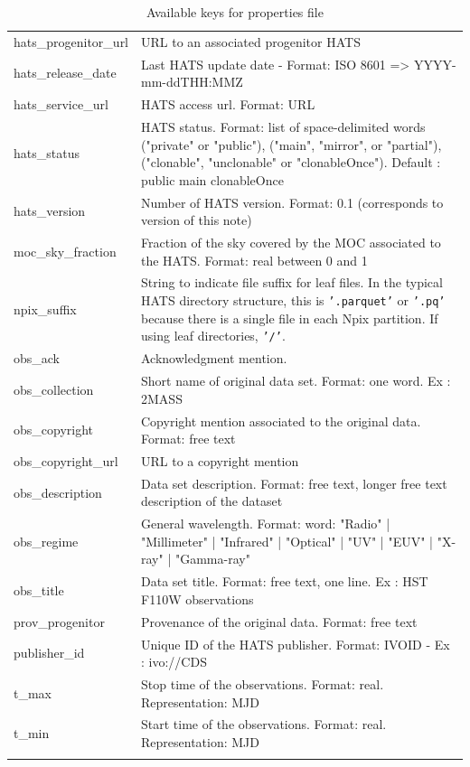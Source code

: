 \documentclass[11pt,a4paper]{ivoa}
\begin{document}
{\begin{longtable}[h!]{D{0.33\textwidth} D{0.67\textwidth}}
hats\_progenitor\_url &URL to an associated progenitor HATS \\
hats\_release\_date &Last HATS update date - Format: ISO 8601 => YYYY-mm-ddTHH:MMZ \\
hats\_service\_url &HATS access url. Format: URL \\
hats\_status &HATS status. Format: list of space-delimited words ("private" or "public"), ("main", "mirror", or "partial"), ("clonable", "unclonable" or "clonableOnce"). Default : public main clonableOnce \\
hats\_version &Number of HATS version. Format: 0.1 (corresponds to version of this note) \\
moc\_sky\_fraction &Fraction of the sky covered by the MOC associated to the HATS. Format: real between 0 and 1 \\
npix\_suffix & String to indicate file suffix for leaf files. In the typical HATS directory structure, this is \texttt{'.parquet'} or \texttt{'.pq'} because there is a single file in each Npix partition. If using leaf directories, \texttt{'/'}. \\
obs\_ack &Acknowledgment mention. \\
obs\_collection &Short name of original data set. Format: one word. Ex : 2MASS \\
obs\_copyright &Copyright mention associated to the original data. Format: free text \\
obs\_copyright\_url &URL to a copyright mention \\
obs\_description &Data set description. Format: free text, longer free text description of the dataset \\
obs\_regime &General wavelength. Format: word: "Radio" | "Millimeter" | "Infrared" | "Optical" | "UV" | "EUV" | "X-ray" | "Gamma-ray" \\
obs\_title &Data set title. Format: free text, one line. Ex : HST F110W observations \\
prov\_progenitor &Provenance of the original data. Format: free text \\
publisher\_id &Unique ID of the HATS publisher. Format: IVOID - Ex : ivo://CDS \\
t\_max &Stop time of the observations. Format: real. Representation: MJD \\
t\_min &Start time of the observations. Format: real. Representation: MJD \\
\sptablerule    
\caption{Available keys for properties file}
\label{tab:properties}
\end{longtable}}
\end{document}
